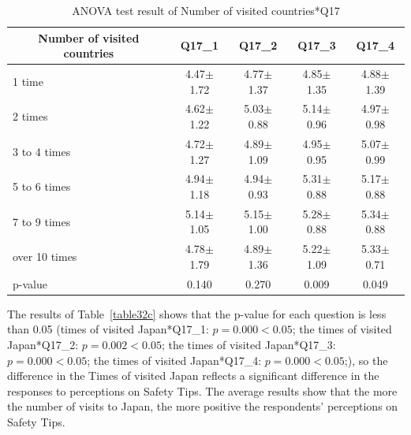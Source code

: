 \begin{table}[h]
  \caption{ANOVA test result of Number of visited countries*Q17}
  \label{table32b}
  \centering
  \begin{tabular}{l|cccc}
 \hline
        \multicolumn{1}{c|}{Number of visited countries}          & Q17\_1               & Q17\_2 & Q17\_3    & Q17\_4       \\
\hline
1 time        & 4.47$\pm$1.72           & 4.77$\pm$1.37  & 4.85$\pm$1.35 & 4.88$\pm$1.39  \\
2 times       & 4.62$\pm$1.22 & 5.03$\pm$0.88 & 5.14$\pm$0.96 & 4.97$\pm$0.98  \\
3 to 4 times  & 4.72$\pm$1.27 & 4.89$\pm$1.09 & 4.95$\pm$0.95& 5.07$\pm$0.99 \\
5 to 6 times  & 4.94$\pm$1.18 & 4.94$\pm$0.93& 5.31$\pm$0.88 & 5.17$\pm$0.88 \\
7 to 9 times  & 5.14$\pm$1.05 & 5.15$\pm$1.00 & 5.28$\pm$0.88 & 5.34$\pm$0.88 \\
over 10 times & 4.78$\pm$1.79& 4.89$\pm$1.36 & 5.22$\pm$1.09 & 5.33$\pm$0.71\\
\hline
p-value&           0.140&         0.270&         0.009&   0.049     \\
 \hline
  \end{tabular}
\end{table}



The results of Table~\ref{table32c} shows that the p-value for each question is less than 0.05 (times of visited Japan*Q17\_1: $p=0.000<0.05$; the times of visited Japan*Q17\_2: $p=0.002<0.05$; the times of visited Japan*Q17\_3: $p=0.000<0.05$; the times of visited Japan*Q17\_4: $p=0.000<0.05$;), so the difference in the Times of visited Japan reflects a significant difference in the responses to perceptions on Safety Tips. The average results show that the more the number of visits to Japan, the more positive the respondents' perceptions on Safety Tips. 



